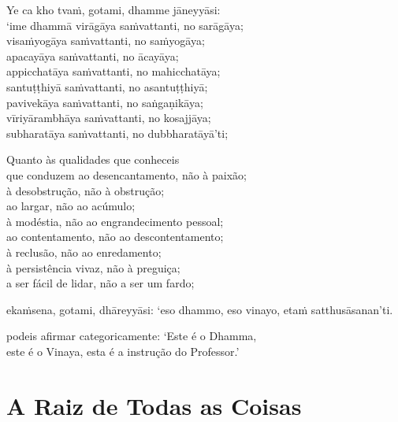 Ye ca kho tvaṁ, gotami, dhamme jāneyyāsi:\\
‘ime dhammā virāgāya saṁvattanti, no sarāgāya;\\
visaṁyogāya saṁvattanti, no saṁyogāya;\\
apacayāya saṁvattanti, no ācayāya;\\
appicchatāya saṁvattanti, no mahicchatāya;\\
santuṭṭhiyā saṁvattanti, no asantuṭṭhiyā;\\
pavivekāya saṁvattanti, no saṅgaṇikāya;\\
vīriyārambhāya saṁvattanti, no kosajjāya;\\
subharatāya saṁvattanti, no dubbharatāyā’ti;

\begin{english}
  Quanto às qualidades que conheceis\\
  que conduzem ao desencantamento, não à paixão;\\
  à desobstrução, não à obstrução;\\
  ao largar, não ao acúmulo;\\
  à modéstia, não ao engrandecimento pessoal;\\
  ao contentamento, não ao descontentamento;\\
  à reclusão, não ao enredamento;\\
  à persistência vivaz, não à preguiça;\\
  a ser fácil de lidar, não a ser um fardo;
\end{english}

ekaṁsena, gotami, dhāreyyāsi: ‘eso dhammo, eso vinayo, etaṁ satthusāsanan’ti.

\begin{english}
  podeis afirmar categoricamente: ‘Este é o Dhamma,\\
  este é o Vinaya, esta é a instrução do Professor.’
\end{english}

\chapter{A Raiz de Todas as Coisas}



